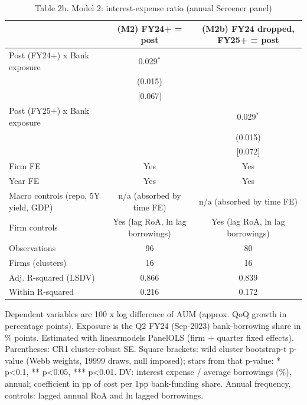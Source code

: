 \begin{table}[htbp]\centering\small
\caption{Table 2b. Model 2: interest-expense ratio (annual Screener panel)}
\begin{tabular}{lcc}
\hline\hline
 & (M2) FY24+ = post & (M2b) FY24 dropped, FY25+ = post \\
\hline
Post (FY24+) x Bank exposure & 0.029$^{*}$ &  \\
 & (0.015) &  \\
 & [0.067] &  \\
Post (FY25+) x Bank exposure &  & 0.029$^{*}$ \\
 &  & (0.015) \\
 &  & [0.072] \\
\hline
Firm FE & Yes & Yes \\
Year FE & Yes & Yes \\
Macro controls (repo, 5Y yield, GDP) & n/a (absorbed by time FE) & n/a (absorbed by time FE) \\
Firm controls & Yes (lag RoA, ln lag borrowings) & Yes (lag RoA, ln lag borrowings) \\
Observations & 96 & 80 \\
Firms (clusters) & 16 & 16 \\
Adj. R-squared (LSDV) & 0.866 & 0.839 \\
Within R-squared & 0.216 & 0.172 \\
\hline\hline
\end{tabular}
\par\footnotesize Dependent variables are 100 x log difference of AUM (approx. QoQ growth in percentage points). Exposure is the Q2 FY24 (Sep-2023) bank-borrowing share in \% points. Estimated with linearmodels PanelOLS (firm + quarter fixed effects). Parentheses: CR1 cluster-robust SE. Square brackets: wild cluster bootstrap-t p-value (Webb weights, 19999 draws, null imposed); stars from that p-value: * p<0.1, ** p<0.05, *** p<0.01. DV: interest expense / average borrowings (\%), annual; coefficient in pp of cost per 1pp bank-funding share. Annual frequency, controls: lagged annual RoA and ln lagged borrowings.
\end{table}